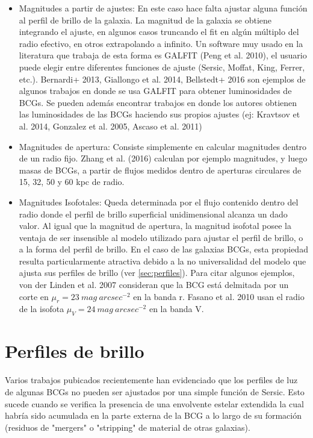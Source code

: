 \begin{itemize}
\item Magnitudes a partir de ajustes: En este caso hace falta ajustar alguna funci\'on al perfil de brillo de la galaxia. La magnitud de la galaxia se obtiene integrando el ajuste, en algunos casos truncando el fit en algún múltiplo del radio efectivo, en otros extrapolando a infinito. Un software muy usado en la literatura que trabaja de esta forma es GALFIT (Peng et al. 2010), el usuario puede elegir entre diferentes funciones de ajuste (Sersic, Moffat, King, Ferrer, etc.).  Bernardi+ 2013, Giallongo et al. 2014, Bellstedt+ 2016 son ejemplos de algunos trabajos en donde se usa GALFIT para obtener luminosidades de BCGs. Se pueden adem\'as encontrar trabajos en donde los autores obtienen las luminosidades de las BCGs haciendo sus propios ajustes (ej: Kravtsov et al. 2014, Gonzalez et al. 2005, Ascaso et al. 2011)

\item Magnitudes de apertura: Consiste simplemente en calcular magnitudes dentro de un radio fijo. Zhang et al. (2016) calculan por ejemplo magnitudes, y luego masas de BCGs, a partir de flujos medidos dentro de aperturas circulares de 15, 32, 50 y 60 kpc de radio.

\item Magnitudes Isofotales: Queda determinada por el flujo contenido dentro del radio donde el perfil de brillo superficial unidimensional alcanza un dado valor. Al igual que la magnitud de apertura, la magnitud isofotal posee la ventaja de ser insensible al modelo utilizado para ajustar el perfil de brillo, o a la forma del perfil de brillo. En el caso de las galaxias BCGs, esta propiedad resulta particularmente atractiva debido a la no universalidad del modelo que ajusta sus perfiles de brillo (ver \autoref{sec:perfiles}). 
Para citar algunos ejemplos, von der Linden et al. 2007 consideran que la BCG est\'a delmitada por un corte en $\mu_r=23~mag~arcsec^{-2}$ en la banda r. Fasano et al. 2010 usan el radio de la isofota $\mu_V=24~mag~arcsec^{-2}$ en la banda V. 




\end{itemize}
\section{Perfiles de brillo}\label{sec:tperfiles}
Varios trabajos pubicados recientemente han evidenciado que los perfiles de luz de algunas BCGs no pueden ser ajustados por una simple funci\'on de Sersic. 
Esto sucede cuando se verifica la presencia de una envolvente estelar extendida la cual habr\'ia sido acumulada en la parte externa de la BCG a lo largo de su formaci\'on (residuos de "mergers" o "stripping" de material de otras galaxias).


